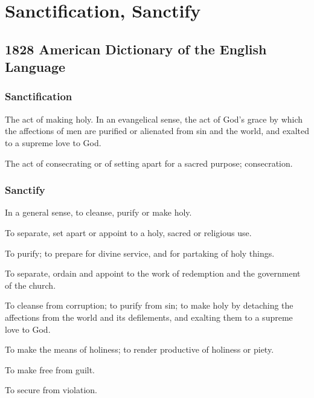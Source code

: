 \section{Sanctification, Sanctify}
	\label{SANCTIFICATION}
	

\subsection{1828 American Dictionary of the English Language} %
	\label{SANCTIFICATION-1828}

	\subsubsection{Sanctification}

		\begin{compactitem}
			\item The act of making holy. In an evangelical sense, the act of God's grace by which the affections of men are purified or alienated from sin and the world, and exalted to a supreme love to God.
			\item The act of consecrating or of setting apart for a sacred purpose; consecration.
		\end{compactitem}
	
	\subsubsection{Sanctify}
	
		\begin{compactitem}
			\item In a general sense, to cleanse, purify or make holy.
			\item To separate, set apart or appoint to a holy, sacred or religious use.
			\item To purify; to prepare for divine service, and for partaking of holy things.
			\item To separate, ordain and appoint to the work of redemption and the government of the church.
			\item To cleanse from corruption; to purify from sin; to make holy by detaching the affections from the world and its defilements, and exalting them to a supreme love to God.
			\item To make the means of holiness; to render productive of holiness or piety.
			\item To make free from guilt.
			\item To secure from violation.
		\end{compactitem}

